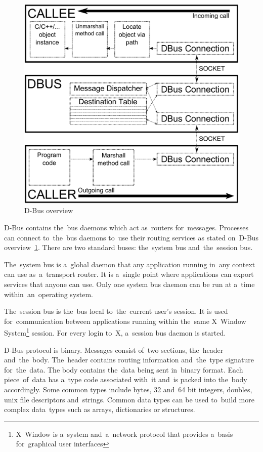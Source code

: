 \documentclass[conference]{IEEEtran}
\begin{document}
\begin{figure}[h]
\centering
\caption{D-Bus overview}
\label{fig:dbus_image}
\includegraphics[width=\columnwidth]{dbus_overview.pdf}
\end{figure}


D-Bus contains the~bus daemons which act as~routers for~messages. Processes
can connect to~the~bus daemons to~use their routing services as stated on~D-Bus
overview~\ref{fig:dbus_image}. There are two standard buses: the~system bus
and~the~session bus.

The~system bus is a~global daemon that any application running in~any
context can use as~a~transport router. It is a~single point where applications
can export services that anyone can use. Only one system bus daemon
can be run at a~time within~an~operating system.

The~session bus is the~bus local to~the~current user's session. It is used
for~communication between applications running within the~same X~Window System\footnote{X~Window is a~system and~a~network protocol that provides a~basis
for~graphical user interfaces} session. For every login to~X, a~session bus
daemon is started.

D-Bus protocol is binary. Messages consist of~two sections, the~header
and~the~body. The~header contains routing information and~the~type signature
for~the~data. The body contains the~data being sent in~binary format. Each
piece~of~data has a~type code \mbox{associated} with~it and~is packed into the~body
accordingly. Some common types include bytes, 32 and~64 bit integers, doubles,
unix file descriptors and~strings. Common data types can be used to~build more
complex data~types such as arrays, dictionaries or structures.
\end{document}
